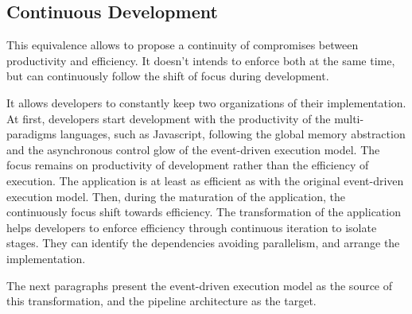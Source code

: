 \subsection{Continuous Development}

This equivalence allows to propose a continuity of compromises between productivity and efficiency.
It doesn't intends to enforce both at the same time, but can continuously follow the shift of focus during development.

It allows developers to constantly keep two organizations of their implementation. %
At first, developers start development with the productivity of the multi-paradigms languages, such as Javascript, following the global memory abstraction and the asynchronous control glow of the event-driven execution model.
The focus remains on productivity of development rather than the efficiency of execution.
The application is at least as efficient as with the original event-driven execution model.
Then, during the maturation of the application, the continuously  focus shift towards efficiency.
The transformation of the application helps developers to enforce efficiency through continuous iteration to isolate stages.
They can identify the dependencies avoiding parallelism, and arrange the implementation.

The next paragraphs present the event-driven execution model as the source of this transformation, and the pipeline architecture as the target.
